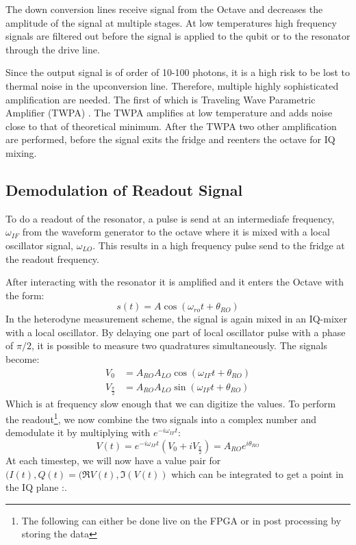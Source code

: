 The down conversion lines receive signal from the Octave and decreases the amplitude of the signal at multiple stages. At low temperatures high frequency signals are filtered out before the signal is applied to the qubit or to the resonator through the drive line.

Since the output signal is of order of 10-100 photons, it is a high risk to be lost to thermal noise in the upconversion line. Therefore, multiple highly sophisticated amplification are needed. The first of which is Traveling Wave Parametric Amplifier (TWPA) \cite{macklin_twpa}. The TWPA amplifies at low temperature and adds noise close to that of theoretical minimum. After the TWPA two other amplification are performed, before the signal exits the fridge and reenters the octave for IQ mixing. 


\subsection{Demodulation of Readout Signal}\label{sec:demodulation}
To do a readout of the resonator, a pulse is send at an intermediafe frequency, $\omega_{IF}$ from the waveform generator to the octave where it is mixed with a local oscillator signal, $\omega_{LO}$. This results in a high frequency pulse send to the fridge at the readout frequency.

After interacting with the resonator it is amplified and it enters the Octave with the form:
\begin{equation}
    s(t) = A \cos(\omega_{ro}t + \theta_{RO}) 
\end{equation}
In the heterodyne measurement scheme, the signal is again mixed in an IQ-mixer with a local oscillator. By delaying one part of local oscillator pulse with a phase of $\pi / 2$, it is possible to measure two quadratures simultaneously. The signals become:
\begin{align}
    V_0               &= A_{RO}A_{LO} \cos(\omega_{IF}t + \theta_{RO}) \\
    V_{\frac{\pi}{2}} &= A_{RO}A_{LO} \sin(\omega_{IF}t + \theta_{RO})
\end{align}
Which is at frequency slow enough that we can digitize the values. To perform the readout\footnote{The following can either be done live on the FPGA or in post processing by storing the data}, we now combine the two signals into a complex number and demodulate it by multiplying with $e^{-i\omega_{IF}t}$:
\begin{equation}
    V(t) = e^{-i\omega_{IF} t} (V_0 + i V_{\frac{\pi}{2}}) = A_{RO} e^{i\theta_{RO}}
\end{equation}
At each timestep, we will now have a value pair for $(I(t), Q(t) = (\Re{V(t), \Im(V(t))}$ which can be integrated to get a point in the IQ plane \cite{krantz_quantum_2019}:. 

